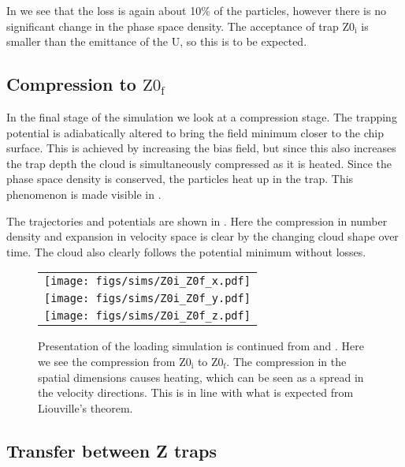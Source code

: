 In  we see that the loss is again about 10\% of
the particles, however there is no significant change in the phase space
density. The acceptance of trap $\mathrm{Z0_i}$ is smaller than the emittance
of the U, so this is to be expected.

\subsection{Compression to $\mathrm{Z0_f}$}

In the final stage of the simulation we look at a compression stage. The
trapping potential is adiabatically altered to bring the field minimum closer
to the chip surface. This is achieved by increasing the bias field, but since
this also increases the trap depth the cloud is simultaneously compressed as it
is heated. Since the phase space density is conserved, the particles heat up in
the trap. This phenomenon is made visible in
.

The trajectories and potentials are shown in .
Here the compression in number density and expansion in velocity space is clear
by the changing cloud shape over time. The cloud also clearly follows the
potential minimum without losses.

%
\begin{figure}[p]
\centering
  \begin{tabular}{c}
    \texttt{[image: figs/sims/Z0i\_Z0f\_x.pdf]} \\
    \texttt{[image: figs/sims/Z0i\_Z0f\_y.pdf]} \\
    \texttt{[image: figs/sims/Z0i\_Z0f\_z.pdf]}
  \end{tabular}
  \caption{Presentation of the loading simulation is continued from
   and . Here we see
  the compression from $\mathrm{Z0_i}$ to $\mathrm{Z0_f}$. The compression in
  the spatial dimensions causes heating, which can be seen as a spread in the
  velocity directions. This is in line with what is expected from Liouville's
  theorem.
  }
  \label{design:fig:Z0i_Z0f}
\end{figure}

\subsection{Transfer between Z traps}
\label{design:transferbetweenzs}

